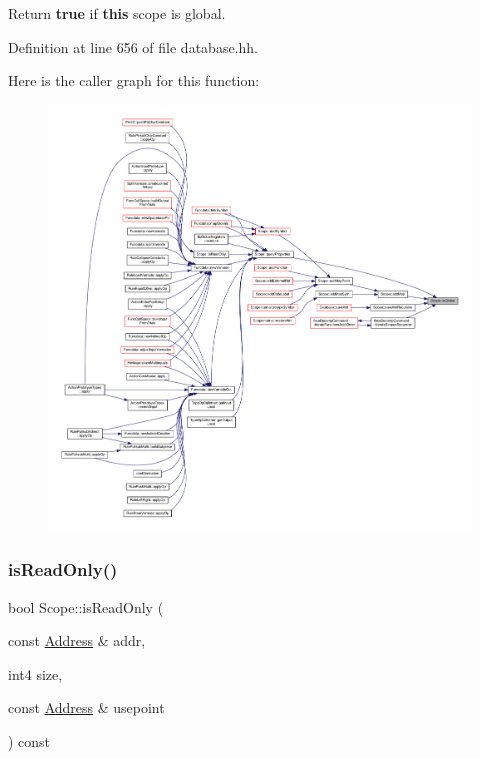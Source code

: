 Return {\bfseries{true}} if {\bfseries{this}} scope is global. 



Definition at line 656 of file database.\+hh.

Here is the caller graph for this function\+:
\nopagebreak
\begin{figure}[H]
\begin{center}
\leavevmode
\includegraphics[width=350pt]{class_scope_a67739f460d64dd75bfd1f2391c95ee0d_icgraph}
\end{center}
\end{figure}
\mbox{\label{class_scope_a7b6645d4ce07bea82322ac366b8c6168}} 
\subsubsection{\texorpdfstring{isReadOnly()}{isReadOnly()}}
{\footnotesize\ttfamily bool Scope\+::is\+Read\+Only (\begin{DoxyParamCaption}\item[{const \mbox{\hyperlink{class_address}{Address}} \&}]{addr,  }\item[{int4}]{size,  }\item[{const \mbox{\hyperlink{class_address}{Address}} \&}]{usepoint }\end{DoxyParamCaption}) const}



